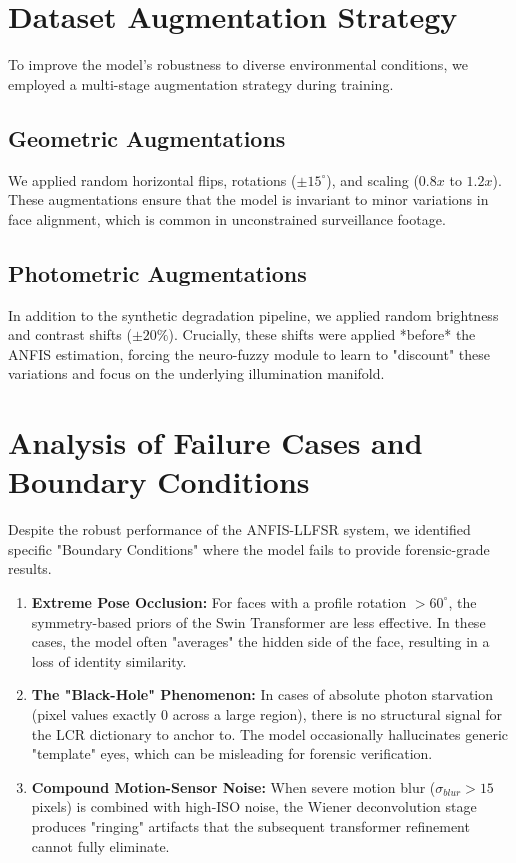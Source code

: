 \section{Dataset Augmentation Strategy}
To improve the model's robustness to diverse environmental conditions, we employed a multi-stage augmentation strategy during training.

\subsection{Geometric Augmentations}
We applied random horizontal flips, rotations ($\pm 15^\circ$), and scaling ($0.8x$ to $1.2x$). These augmentations ensure that the model is invariant to minor variations in face alignment, which is common in unconstrained surveillance footage.

\subsection{Photometric Augmentations}
In addition to the synthetic degradation pipeline, we applied random brightness and contrast shifts ($\pm 20\%$). Crucially, these shifts were applied *before* the ANFIS estimation, forcing the neuro-fuzzy module to learn to "discount" these variations and focus on the underlying illumination manifold.

\section{Analysis of Failure Cases and Boundary Conditions}
Despite the robust performance of the ANFIS-LLFSR system, we identified specific "Boundary Conditions" where the model fails to provide forensic-grade results.
\begin{enumerate}
    \item \textbf{Extreme Pose Occlusion:} For faces with a profile rotation $>60^\circ$, the symmetry-based priors of the Swin Transformer are less effective. In these cases, the model often "averages" the hidden side of the face, resulting in a loss of identity similarity.
    \item \textbf{The "Black-Hole" Phenomenon:} In cases of absolute photon starvation (pixel values exactly 0 across a large region), there is no structural signal for the LCR dictionary to anchor to. The model occasionally hallucinates generic "template" eyes, which can be misleading for forensic verification.
    \item \textbf{Compound Motion-Sensor Noise:} When severe motion blur ($\sigma_{blur} > 15$ pixels) is combined with high-ISO noise, the Wiener deconvolution stage produces "ringing" artifacts that the subsequent transformer refinement cannot fully eliminate.
\end{enumerate}

